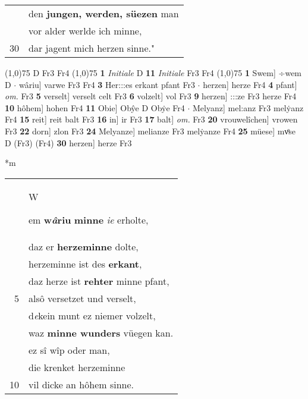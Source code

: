 \documentclass[8pt,a4paper,notitlepage]{article}
\begin{document}
\begin{table}[ht]
\begin{minipage}[t]{0.5\linewidth}
\begin{tabular}{rl}
 & den \textbf{jungen, werden, süezen} man\\ 
 & vor alder werlde ich minne,\\ 
30 & dar jagent mich herzen sinne."\\ 
\end{tabular}
\scriptsize
\line(1,0){75} \newline
D Fr3 Fr4 \newline
\line(1,0){75} \newline
\textbf{1} \textit{Initiale} D  \textbf{11} \textit{Initiale} Fr3 Fr4  \newline
\line(1,0){75} \newline
\textbf{1} Swem] ÷wem D  $\cdot$ wâriu] varwe Fr3 Fr4 \textbf{3} Her:::es erkant pfant Fr3  $\cdot$ herzen] herze Fr4 \textbf{4} pfant] \textit{om.} Fr3 \textbf{5} verselt] verselt celt Fr3 \textbf{6} volzelt] vol Fr3 \textbf{9} herzen] :::ze Fr3 herze Fr4 \textbf{10} hôhem] hohen Fr4 \textbf{11} Obie] Obŷe D Obẏe Fr4  $\cdot$ Melyanz] mel:anz Fr3 melẏanz Fr4 \textbf{15} reit] reit balt Fr3 \textbf{16} in] ir Fr3 \textbf{17} balt] \textit{om.} Fr3 \textbf{20} vrouwelîchen] vrowen Fr3 \textbf{22} dorn] zlon Fr3 \textbf{24} Melyanze] melianze Fr3 melẏanze Fr4 \textbf{25} müese] mvͦse D (Fr3) (Fr4) \textbf{30} herzen] herze Fr3 \newline
\end{minipage}
\hspace{0.5cm}
\begin{minipage}[t]{0.5\linewidth}
\small
\begin{center}*m
\end{center}
\begin{tabular}{rl}
 & \begin{large}W\end{large}em \textbf{w\textit{â}riu} \textbf{minne} \textit{ie} erholte,\\ 
 & daz er \textbf{herzeminne} dolte,\\ 
 & herzeminne ist des \textbf{erkant},\\ 
 & daz herze ist \textbf{rehter} minne pfant,\\ 
5 & alsô versetzet und verselt,\\ 
 & d\textit{e}kein munt ez niemer volzelt,\\ 
 & waz \textbf{minne wunders} vüegen kan.\\ 
 & ez sî wîp oder man,\\ 
 & die krenket herzeminne\\ 
10 & vil dicke an hôhem sinne.\\ 

\end{tabular}
\end{minipage}
\end{table}
\end{document}
